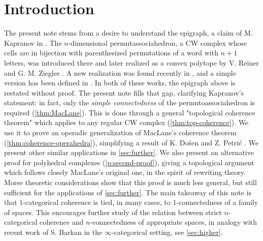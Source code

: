 
\section*{Introduction} 
\label{s:introduction}

The present note stems from a desire to understand the epigraph, a claim of M. Kapranov in \cite{kapranov1993}. 
The $n$-dimensional permutassociahedron, a CW complex whose cells are in bijection with parenthesized permutations of a word with $n+1$ letters, was introduced there and later realized as a convex polytope by V. Reiner and G. M. Ziegler \cite{reinerCoxeterassociahedra1994}. 
A new realization was found recently in \cite{CastilloLiu21}, and a simple version has been defined in \cite{baralicSimplePermutoassociahedron2019}.
In both of these works, the epigraph above is restated without proof. 
The present note fills that gap, clarifying Kapranov's statement: in fact, only the \emph{simple connectedness} of the permutoassociahedron is required (\cref{thm:MacLane}).
This is done through a general "topological coherence theorem" which applies to any regular CW complex (\cref{thm:top-coherence}).
We use it to prove an operadic generalization of MacLane's coherence theorem (\cref{thm:coherence-operahedra}), simplifying a result of K. Do{\v s}en and Z. Petri{\'c} \cite{DP15}.
We present other similar applications in \cref{sec:further}. 
We also present an alternative proof for polyhedral complexes (\cref{p:second-proof}), giving a topological argument which follows closely MacLane's original one, in the spirit of rewriting theory. 
Morse theoretic considerations show that this proof is much less general, but still sufficient for the applications of \cref{sec:further}.
The main takeaway of this note is that $1$-categorical coherence is tied, in many cases, to $1$-connectedness of a family of spaces. 
This encourages further study of the relation between strict $n$-categorical coherence and $n$-connectedness of appropriate spaces, in analogy with recent work of S. Barkan \cite{barkanArityApproximationInfty2022} in the $\infty$-categorical setting, see \cref{sec:higher}.



